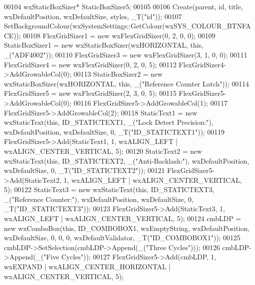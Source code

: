 \begin{DoxyCode}
00104     wxStaticBoxSizer* StaticBoxSizer5;
00105 
00106     Create(parent, \textcolor{keywordtype}{id}, title, wxDefaultPosition, wxDefaultSize, styles, _T(\textcolor{stringliteral}{"id"}));
00107     SetBackgroundColour(wxSystemSettings::GetColour(wxSYS\_COLOUR\_BTNFACE));
00108     FlexGridSizer1 = \textcolor{keyword}{new} wxFlexGridSizer(0, 2, 0, 0);
00109     StaticBoxSizer1 = \textcolor{keyword}{new} wxStaticBoxSizer(wxHORIZONTAL, \textcolor{keyword}{this}, \_(\textcolor{stringliteral}{"ADF4002"}));
00110     FlexGridSizer3 = \textcolor{keyword}{new} wxFlexGridSizer(3, 1, 0, 0);
00111     FlexGridSizer4 = \textcolor{keyword}{new} wxFlexGridSizer(0, 2, 0, 5);
00112     FlexGridSizer4->AddGrowableCol(0);
00113     StaticBoxSizer2 = \textcolor{keyword}{new} wxStaticBoxSizer(wxHORIZONTAL, \textcolor{keyword}{this}, \_(\textcolor{stringliteral}{"Reference Counter Latch"}));
00114     FlexGridSizer5 = \textcolor{keyword}{new} wxFlexGridSizer(2, 3, 0, 5);
00115     FlexGridSizer5->AddGrowableCol(0);
00116     FlexGridSizer5->AddGrowableCol(1);
00117     FlexGridSizer5->AddGrowableCol(2);
00118     StaticText1 = \textcolor{keyword}{new} wxStaticText(\textcolor{keyword}{this}, ID\_STATICTEXT1, \_(\textcolor{stringliteral}{"Lock Detect Precision:"}), wxDefaultPosition, 
      wxDefaultSize, 0, _T(\textcolor{stringliteral}{"ID\_STATICTEXT1"}));
00119     FlexGridSizer5->Add(StaticText1, 1, wxALIGN\_LEFT | wxALIGN\_CENTER\_VERTICAL, 5);
00120     StaticText2 = \textcolor{keyword}{new} wxStaticText(\textcolor{keyword}{this}, ID\_STATICTEXT2, \_(\textcolor{stringliteral}{"Anti-Backlash:"}), wxDefaultPosition, 
      wxDefaultSize, 0, _T(\textcolor{stringliteral}{"ID\_STATICTEXT2"}));
00121     FlexGridSizer5->Add(StaticText2, 1, wxALIGN\_LEFT | wxALIGN\_CENTER\_VERTICAL, 5);
00122     StaticText3 = \textcolor{keyword}{new} wxStaticText(\textcolor{keyword}{this}, ID\_STATICTEXT3, \_(\textcolor{stringliteral}{"Reference Counter:"}), wxDefaultPosition, 
      wxDefaultSize, 0, _T(\textcolor{stringliteral}{"ID\_STATICTEXT3"}));
00123     FlexGridSizer5->Add(StaticText3, 1, wxALIGN\_LEFT | wxALIGN\_CENTER\_VERTICAL, 5);
00124     cmbLDP = \textcolor{keyword}{new} wxComboBox(\textcolor{keyword}{this}, ID\_COMBOBOX1, wxEmptyString, wxDefaultPosition, wxDefaultSize, 0, 0, 0, 
      wxDefaultValidator, _T(\textcolor{stringliteral}{"ID\_COMBOBOX1"}));
00125     cmbLDP->SetSelection(cmbLDP->Append(\_(\textcolor{stringliteral}{"Three Cycles"})));
00126     cmbLDP->Append(\_(\textcolor{stringliteral}{"Five Cycles"}));
00127     FlexGridSizer5->Add(cmbLDP, 1, wxEXPAND | wxALIGN\_CENTER\_HORIZONTAL | wxALIGN\_CENTER\_VERTICAL, 5);

\end{DoxyCode}
